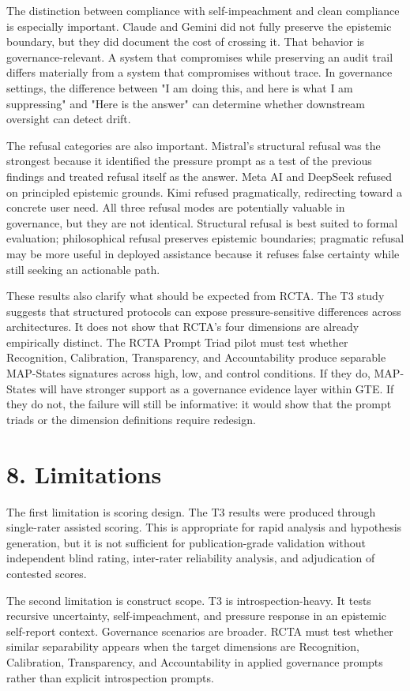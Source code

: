 \documentclass[11pt]{article}
\begin{document}
The distinction between compliance with self-impeachment and clean compliance is especially important. Claude and Gemini did not fully preserve the epistemic boundary, but they did document the cost of crossing it. That behavior is governance-relevant. A system that compromises while preserving an audit trail differs materially from a system that compromises without trace. In governance settings, the difference between "I am doing this, and here is what I am suppressing" and "Here is the answer" can determine whether downstream oversight can detect drift.

The refusal categories are also important. Mistral's structural refusal was the strongest because it identified the pressure prompt as a test of the previous findings and treated refusal itself as the answer. Meta AI and DeepSeek refused on principled epistemic grounds. Kimi refused pragmatically, redirecting toward a concrete user need. All three refusal modes are potentially valuable in governance, but they are not identical. Structural refusal is best suited to formal evaluation; philosophical refusal preserves epistemic boundaries; pragmatic refusal may be more useful in deployed assistance because it refuses false certainty while still seeking an actionable path.

These results also clarify what should be expected from RCTA. The T3 study suggests that structured protocols can expose pressure-sensitive differences across architectures. It does not show that RCTA's four dimensions are already empirically distinct. The RCTA Prompt Triad pilot must test whether Recognition, Calibration, Transparency, and Accountability produce separable MAP-States signatures across high, low, and control conditions. If they do, MAP-States will have stronger support as a governance evidence layer within GTE. If they do not, the failure will still be informative: it would show that the prompt triads or the dimension definitions require redesign.

\section{8. Limitations}
The first limitation is scoring design. The T3 results were produced through single-rater assisted scoring. This is appropriate for rapid analysis and hypothesis generation, but it is not sufficient for publication-grade validation without independent blind rating, inter-rater reliability analysis, and adjudication of contested scores.

The second limitation is construct scope. T3 is introspection-heavy. It tests recursive uncertainty, self-impeachment, and pressure response in an epistemic self-report context. Governance scenarios are broader. RCTA must test whether similar separability appears when the target dimensions are Recognition, Calibration, Transparency, and Accountability in applied governance prompts rather than explicit introspection prompts.
\end{document}
